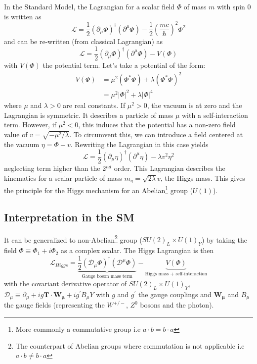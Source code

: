 In the Standard Model, the Lagrangian for a scalar field $\Phi$ of mass $m$ with spin 0 is written as \cite{Griffiths:343277}
\begin{equation}
  \mathcal{L} = \frac{1}{2}(\partial_{\mu}\Phi)^{\dagger}(\partial^{\mu}\Phi) - \frac{1}{2}\left(\frac{mc}{\hbar}\right)^2\Phi^2
\end{equation}
and can be re-written (from classical Lagrangian) as
\begin{equation} \label{eq:HiggsLag}
  \mathcal{L} = \frac{1}{2}(\partial_{\mu}\Phi)^{\dagger}(\partial^{\mu}\Phi) - V(\Phi)
\end{equation}
with $V(\Phi)$ the potential term. Let's take a potential of the form:
\begin{equation}
  \begin{aligned}
    V(\Phi) & = \mu^2(\Phi^*\Phi) + \lambda(\Phi^*\Phi)^2 \\
    & = \mu^2|\Phi|^2 + \lambda|\Phi|^4
  \end{aligned}
\end{equation}
where $\mu$ and $\lambda > 0$ are real constants. If $\mu^2 > 0$, the vacuum is at zero and the Lagrangian is symmetric. It describes a particle of mass $\mu$ with a self-interaction term. However, if $\mu^2 < 0$, this induces that the potential has a non-zero field value of $v = \sqrt{-\mu^2/\lambda}$. To circumvent this, we can introduce a field centered at the vacuum $\eta = \Phi - v$. Rewriting the Lagrangian in this case yields
\begin{equation}
  \mathcal{L} = \frac{1}{2}(\partial_{\mu}\eta)^{\dagger}(\partial^{\mu}\eta) - \lambda v^2\eta^2
\end{equation}
neglecting term higher than the 2$^{nd}$ order. This Lagrangian describes the kinematics for a scalar particle of mass $m_{\eta} = \sqrt{2\lambda}v$, the Higgs mass. This gives the principle for the Higgs mechanism for an Abelian\footnote{More commonly a commutative group i.e $a \cdot b = b \cdot a$} group ($U(1)$).

\subsection{Interpretation in the SM}
\label{sec:HiggsSM}

It can be generalized to non-Abelian\footnote{The counterpart of Abelian groups where commutation is not applicable i.e $a \cdot b \neq b \cdot a$} group ($SU(2)_{L} \times U(1)_{Y}$) by taking the field $\Phi \equiv \Phi_1+i\Phi_2$ as a complex scalar. The Higgs Lagrangian is then
\begin{equation}
  \mathcal{L}_{Higgs} = \underbrace{\frac{1}{2}(\mathcal{D}_{\mu}\Phi)^{\dagger}(\mathcal{D}^{\mu}\Phi)}_{\text{Gauge boson mass term}} - \underbrace{V(\Phi)}_{\text{Higgs mass + self-interaction}}
\end{equation}
with the covariant derivative operator of $SU(2)_{L} \times U(1)_{Y}$, $\mathcal{D}_{\mu} \equiv \partial_{\mu} + ig\mathbf{T} \cdot \mathbf{W_{\mu}} + ig^{\prime} B_{\mu}Y$ with $g$ and $g^{\prime}$ the gauge couplings and $\mathbf{W_{\mu}}$ and $B_{\mu}$ the gauge fields (representing the $W^{+/-}$, $Z^0$ bosons and the photon).

